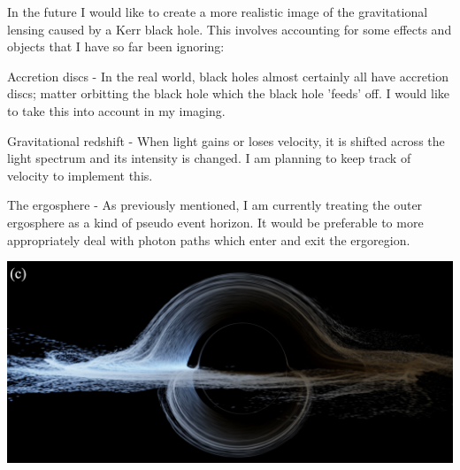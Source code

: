 \documentclass[landscape,a2paper,fontscale=1]{baposter} %
\begin{document}
\begin{poster}
{In the future I would like to create a more realistic image of the gravitational lensing caused by a Kerr black hole. This involves accounting for some effects and objects that I have so far been ignoring:

\vspace{1em}
Accretion discs - In the real world, black holes almost certainly all have accretion discs; matter orbitting the black hole which the black hole 'feeds' off. I would like to take this into account in my imaging.

\vspace{1em}
Gravitational redshift - When light gains or loses velocity, it is shifted across the light spectrum and its intensity is changed. I am planning to keep track of velocity to implement this.

\vspace{1em}
The ergosphere - As previously mentioned, I am currently treating the outer ergosphere as a kind of pseudo event horizon. It would be preferable to more appropriately deal with photon paths which enter and exit the ergoregion.

\vspace{1em}
\begin{center}
\includegraphics[width=0.65\linewidth]{realistic}
\end{center}
}


\end{poster}
\end{document}
